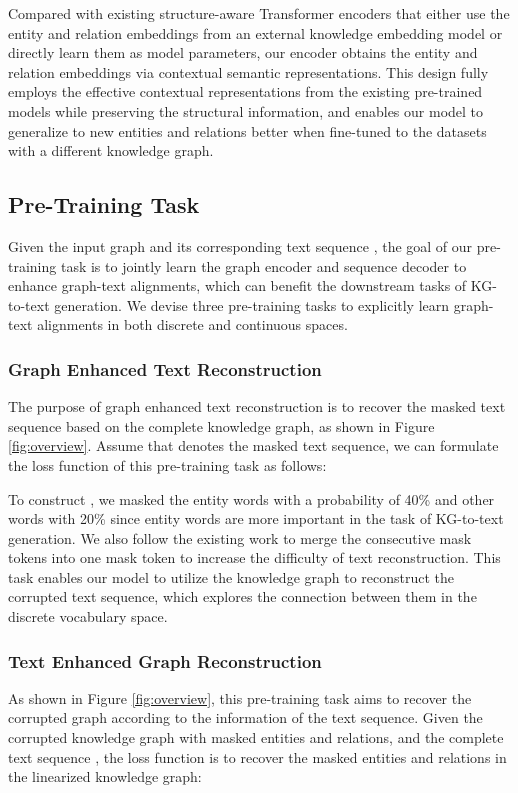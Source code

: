\documentclass[11pt,a4paper]{article}
\begin{document}
Compared with existing structure-aware Transformer encoders \cite{zhu2019structaware,song2020structure} that either use the entity and relation embeddings from an external knowledge embedding model or directly learn them as model parameters, our encoder obtains the entity and relation embeddings via contextual semantic representations. This design fully employs the effective contextual representations from the existing pre-trained models while preserving the structural information, and enables our model to generalize to new entities and relations better when fine-tuned to the datasets with a different knowledge graph.




\subsection{Pre-Training Task}
\label{sec:pretrain}

Given the input graph  and its corresponding text sequence , the goal of our pre-training task is to jointly learn the graph encoder and sequence decoder to enhance graph-text alignments, which can benefit the downstream tasks of KG-to-text generation.
We devise three pre-training tasks to explicitly learn graph-text alignments in both discrete and continuous spaces.

\subsubsection{Graph Enhanced Text Reconstruction}




The purpose of graph enhanced text reconstruction is to recover the masked text sequence based on the complete knowledge graph, as shown in Figure \ref{fig:overview}. Assume that  denotes the masked text sequence, we can formulate the loss function of this pre-training task as follows:


To construct , we masked the entity words with a probability of 40\% and other words with 20\% since entity words are more important in the task of KG-to-text generation. We also follow the existing work \cite{lewis2020bart} to merge the consecutive mask tokens into one mask token to increase the difficulty of text reconstruction. This task enables our model to utilize the knowledge graph to reconstruct the corrupted text sequence, which explores the connection between them in the discrete vocabulary space.

\subsubsection{Text Enhanced Graph Reconstruction}
As shown in Figure \ref{fig:overview}, this pre-training task aims to recover the corrupted graph according to the information of the text sequence. Given the corrupted knowledge graph  with masked entities and relations, and the complete text sequence , the loss function is to recover the masked entities and relations in the linearized knowledge graph:
\end{document}
